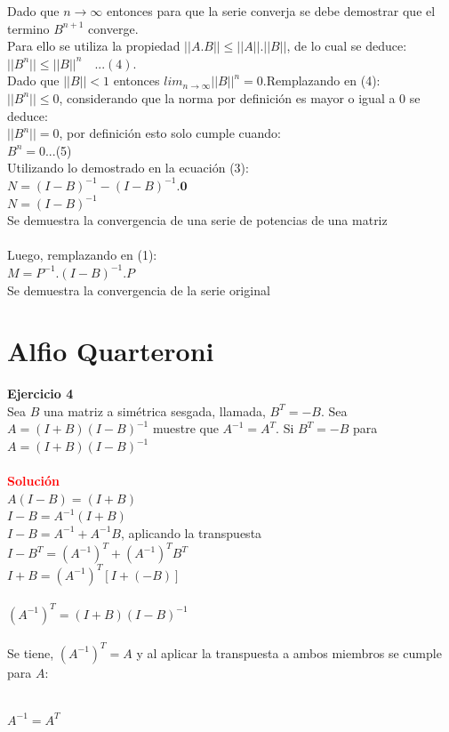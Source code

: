 \documentclass[12pt]{article}
\begin{document}
Dado que $n \to \infty$ entonces para que la serie converja se debe demostrar que el termino $B^{n+1}$ converge.\\
Para ello se utiliza la propiedad $||A.B|| \leq ||A||.||B||$, de lo cual se deduce:\\
$||B^n|| \leq ||B||^n\quad...(4)$.\\

Dado que $||B||<1$ entonces $lim_{n\to \infty}||B||^n=0$.Remplazando en (4):\\
$||B^n|| \leq 0$, considerando que la norma por definición es mayor o igual a 0 se deduce:\\
$||B^n|| = 0$, por definición esto solo cumple cuando:\\
$B^n=0$\quad...(5)\\

Utilizando lo demostrado en la ecuación (3):\\
$N=(I-B)^{-1}-(I-B)^{-1}.\textbf{0}$\\
$N=(I-B)^{-1}$\\
Se demuestra la convergencia de una serie de potencias de una matriz\\\\
Luego, remplazando en (1):\\
$M=P^{-1}.(I-B)^{-1}.P$\\
Se demuestra la convergencia de la serie original\\

%
\section{Alfio Quarteroni}
\noindent \textbf{Ejercicio 4}\\
Sea $B$ una matriz a simétrica sesgada, llamada, $B^{T} =−B$. Sea $A = (I+B)(I− B)^{-1}$ muestre que  $A^{-1}=A^{T}$. 
Si $B^T=-B$ para $A = (I+B)(I-B)^{-1}$ \\\\
\noindent \textcolor{red}{\bf Soluci\'on}\\
$A(I-B)=(I+B)$\\
$I-B=A^{-1}(I+B)$\\
$I-B=A^{-1} + A^{-1}B$, aplicando la transpuesta\\
$I-B^T=(A^{-1})^{T}+(A^{-1})^{T}B^T$\\
$I+B=(A^{-1})^{T}[I + (-B)]$\\\\
$(A^{-1})^{T}=(I+B)(I-B)^{-1}$\\\\
Se tiene, $(A^{-1})^{T}=A$ y al aplicar la transpuesta a ambos miembros se cumple para $A$:\\\\
\begin{center}
$A^{-1}=A^{T}$   \\
\end{center}
\end{document}
